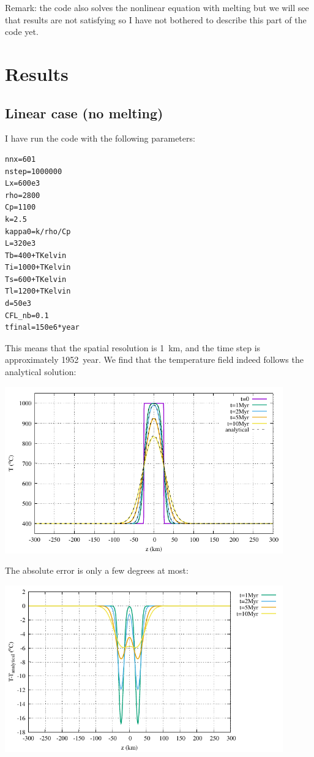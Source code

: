 Remark: the code also solves the nonlinear equation with melting 
but we will see that results are not satisfying so 
I have not bothered to describe this part of the code yet.

\section*{Results}

\subsection*{Linear case (no melting)}

I have run the code with the following parameters:
\begin{lstlisting}
nnx=601
nstep=1000000
Lx=600e3
rho=2800
Cp=1100
k=2.5
kappa0=k/rho/Cp
L=320e3
Tb=400+TKelvin
Ti=1000+TKelvin
Ts=600+TKelvin
Tl=1200+TKelvin
d=50e3
CFL_nb=0.1
tfinal=150e6*year
\end{lstlisting}
This means that the spatial resolution is 1~km, and the time step is approximately 1952~year. 
We find that the temperature field indeed follows the analytical solution:
\begin{center}
\includegraphics[width=12cm]{python_codes/fieldstone_169/results/linear/T.pdf}
\end{center}
The absolute error is only a few degrees at most:
\begin{center}
\includegraphics[width=12cm]{python_codes/fieldstone_169/results/linear/T_error.pdf}
\end{center}

